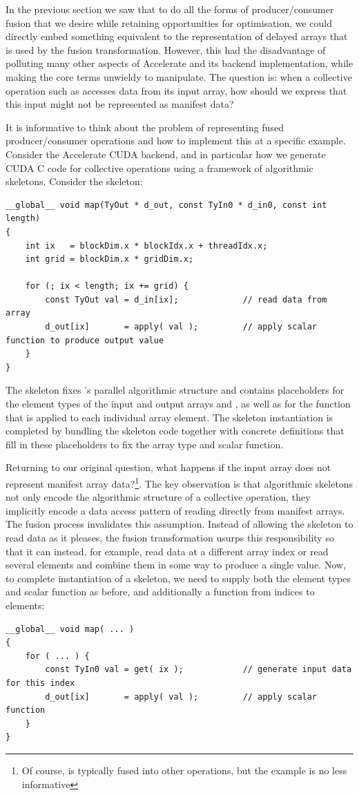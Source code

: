 In the previous section we saw that to do all the forms of producer/consumer
fusion that we desire while retaining opportunities for optimisation, we could
directly embed something equivalent to the representation of delayed arrays that
is used by the fusion transformation. However, this had the disadvantage of
polluting many other aspects of Accelerate and its backend implementation, while
making the core terms unwieldy to manipulate.
%
The question is: when a collective operation such as  accesses data
from its input array, how should we express that this input might not be
represented as manifest data?

It is informative to think about the problem of representing fused
producer/consumer operations and how to implement this at a specific example.
Consider the Accelerate CUDA backend, and in particular how we generate CUDA C
code for collective operations using a framework of algorithmic skeletons.
Consider the  skeleton:
%
\begin{lstlisting}[style=cuda]
__global__ void map(TyOut * d_out, const TyIn0 * d_in0, const int length)
{
    int ix   = blockDim.x * blockIdx.x + threadIdx.x;
    int grid = blockDim.x * gridDim.x;

    for (; ix < length; ix += grid) {
        const TyOut val = d_in[ix];             // read data from array
        d_out[ix]       = apply( val );         // apply scalar function to produce output value
    }
}
\end{lstlisting}
%
The skeleton fixes 's parallel algorithmic structure and contains
placeholders for the element types of the input and output arrays 
and , as well as for the function  that is applied
to each individual array element. The skeleton instantiation is completed by
bundling the skeleton code together with concrete definitions that fill in these
placeholders to fix the array type and scalar function.

Returning to our original question, what happens if the input array does not
represent manifest array data?\footnote{Of course,  is typically
fused into other operations, but the example is no less informative}. The key
observation is that algorithmic skeletons not only encode the algorithmic
structure of a collective operation, they implicitly encode a data access
pattern of reading directly from manifest arrays. The fusion process invalidates
this assumption. Instead of allowing the skeleton to read data as it pleases,
the fusion transformation usurps this responsibility so that it can instead, for
example, read data at a different array index or read several elements and
combine them in some way to produce a single value. Now, to complete
instantiation of a skeleton, we need to supply both the element types and scalar
function as before, and additionally a function from indices to elements:
%
\begin{lstlisting}[style=cuda]
__global__ void map( ... )
{
    for ( ... ) {
        const TyIn0 val = get( ix );            // generate input data for this index
        d_out[ix]       = apply( val );         // apply scalar function
    }
}
\end{lstlisting}

